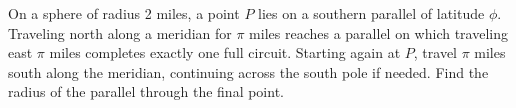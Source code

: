 On a sphere of radius 2 miles, a point $ P $ lies on a southern parallel of latitude $\phi $. Traveling north along a meridian for $\pi $ miles reaches a parallel on which traveling east $\pi $ miles completes exactly one full circuit. Starting again at $ P $, travel $\pi $ miles south along the meridian, continuing across the south pole if needed. Find the radius of the parallel through the final point.
